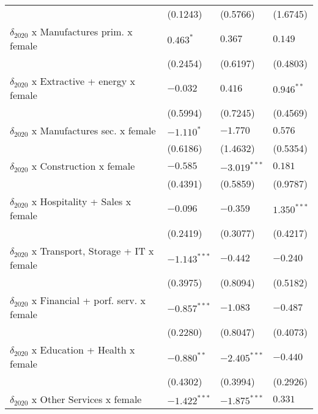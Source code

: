 \begin{tabular}{llll}
                                                   &        (0.1243) &        (0.5766) &        (1.6745) \\
$\delta_{2020}$ x Manufactures prim. x female      &       $0.463^*$ &         $0.367$ &         $0.149$ \\
                                                   &        (0.2454) &        (0.6197) &        (0.4803) \\
$\delta_{2020}$ x Extractive + energy x female     &        $-0.032$ &         $0.416$ &    $0.946^{**}$ \\
                                                   &        (0.5994) &        (0.7245) &        (0.4569) \\
$\delta_{2020}$ x Manufactures sec. x female       &      $-1.110^*$ &        $-1.770$ &         $0.576$ \\
                                                   &        (0.6186) &        (1.4632) &        (0.5354) \\
$\delta_{2020}$ x Construction x female            &        $-0.585$ &  $-3.019^{***}$ &         $0.181$ \\
                                                   &        (0.4391) &        (0.5859) &        (0.9787) \\
$\delta_{2020}$ x Hospitality + Sales x female     &        $-0.096$ &        $-0.359$ &   $1.350^{***}$ \\
                                                   &        (0.2419) &        (0.3077) &        (0.4217) \\
$\delta_{2020}$ x Transport, Storage + IT x female &  $-1.143^{***}$ &        $-0.442$ &        $-0.240$ \\
                                                   &        (0.3975) &        (0.8094) &        (0.5182) \\
$\delta_{2020}$ x Financial + porf. serv. x female &  $-0.857^{***}$ &        $-1.083$ &        $-0.487$ \\
                                                   &        (0.2280) &        (0.8047) &        (0.4073) \\
$\delta_{2020}$ x Education + Health x female      &   $-0.880^{**}$ &  $-2.405^{***}$ &        $-0.440$ \\
                                                   &        (0.4302) &        (0.3994) &        (0.2926) \\
$\delta_{2020}$ x Other Services x female          &  $-1.422^{***}$ &  $-1.875^{***}$ &         $0.331$ \\

\end{tabular}
